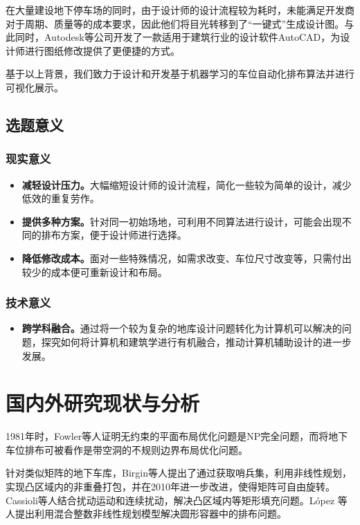 在大量建设地下停车场的同时，由于设计师的设计流程较为耗时，未能满足开发商对于周期、质量等的成本要求，因此他们将目光转移到了“一键式”生成设计图。与此同时，Autodesk\cite{carrasco2005innovative,JCJG202304039}等公司开发了一款适用于建筑行业的设计软件AutoCAD，为设计师进行图纸修改提供了更便捷的方式。

基于以上背景，我们致力于设计和开发基于机器学习的车位自动化排布算法并进行可视化展示。
\subsection{选题意义}
\subsubsection{现实意义}
\begin{itemize}
    \item {\bfseries 减轻设计压力。}大幅缩短设计师的设计流程，简化一些较为简单的设计，减少低效的重复劳作。
    \item {\bfseries 提供多种方案。}针对同一初始场地，可利用不同算法进行设计，可能会出现不同的排布方案，便于设计师进行选择。
    \item {\bfseries 降低修改成本。}面对一些特殊情况，如需求改变、车位尺寸改变等，只需付出较少的成本便可重新设计和布局。
\end{itemize}
\subsubsection{技术意义}
\begin{itemize}
    \item {\bfseries 跨学科融合。}通过将一个较为复杂的地库设计问题转化为计算机可以解决的问题，探究如何将计算机和建筑学进行有机融合，推动计算机辅助设计的进一步发展。
\end{itemize}
\section{国内外研究现状与分析}
1981年时，Fowler\cite{fowler1981optimal}等人证明无约束的平面布局优化问题是NP完全问题，而将地下车位排布可被看作是带空洞的不规则边界布局优化问题。

针对类似矩阵的地下车库，Birgin\cite{birgin2006method, birgin2006orthogonal}等人提出了通过获取哨兵集，利用非线性规划，实现凸区域内的非重叠打包，并在2010年进一步改进\cite{birgin2010orthogonal}，使得矩阵可自由旋转。Cassioli\cite{cassioli2010heuristic}等人结合扰动运动和连续扰动，解决凸区域内等矩形填充问题。L{\'o}pez \cite{lopez2018packing}等人提出利用混合整数非线性规划模型解决圆形容器中的排布问题。

